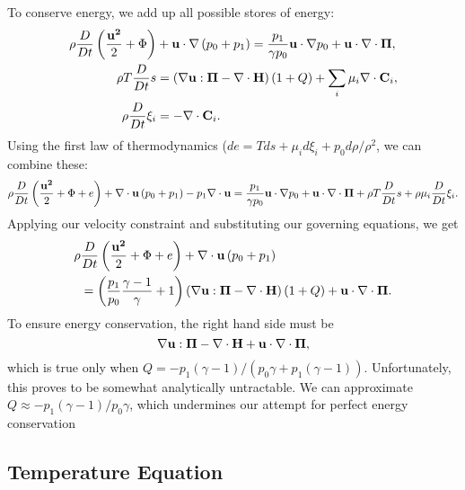 	To conserve energy, we add up all possible stores of energy:
	\begin{align}
		\rho\frac{D}{Dt}\left(\frac{\mathbf{u^{2}}}{2}+\Phi\right)&+\mathbf{u}\cdot\nabla \left(p_{0} + p_{1}\right)=\frac{p_{1}}{\gamma p_{0}}\mathbf{u}\cdot\nabla p_{0}+\mathbf{u}\cdot\nabla\cdot\mathbf{\Pi},\\
		\rho T\frac{D}{Dt}s&=\left(\nabla\mathbf{u}:\mathbf{\Pi}-\nabla\cdot{\mathbf{H}}\right)\left(1 + Q\right) +\sum_{i}\mu_{i}\nabla\cdot\mathbf{C}_{i},\\
		\rho\frac{D}{Dt}\xi_{i}&=-\nabla\cdot\mathbf{C}_{i}.
	\end{align}
	Using the first law of thermodynamics ($de = Tds + \mu_{i} d\xi_{i} + p_{0} d\rho / \rho^{2}$, we can combine these:
	\begin{equation}
		\rho\frac{D}{Dt}\left(\frac{\mathbf{u^{2}}}{2}+\Phi + e\right)+\nabla\cdot\mathbf{u} \left(p_{0} + p_{1}\right)-p_{1}\nabla\cdot\mathbf{u}=\frac{p_{1}}{\gamma p_{0}}\mathbf{u}\cdot\nabla p_{0}+\mathbf{u}\cdot\nabla\cdot\mathbf{\Pi}+\rho T\frac{D}{Dt}s+\rho \mu_{i}\frac{D}{Dt}\xi_{i}.
	\end{equation}
	Applying our velocity constraint and substituting our governing equations, we get
	\begin{align}
		\rho&\frac{D}{Dt}\left(\frac{\mathbf{u^{2}}}{2}+\Phi + e\right)+\nabla\cdot\mathbf{u} \left(p_{0} + p_{1}\right)\\
		&=\left(\frac{p_{1}}{p_{0}}\frac{\gamma - 1}{\gamma} + 1\right)\left(\nabla\mathbf{u}:\mathbf{\Pi}-\nabla\cdot{\mathbf{H}}\right)\left(1 + Q\right)+\mathbf{u}\cdot\nabla\cdot\mathbf{\Pi}.
	\end{align}
	To ensure energy conservation, the right hand side must be
	\begin{equation}
		\nabla\mathbf{u}:\mathbf{\Pi}-\nabla\cdot{\mathbf{H}} + \mathbf{u}\cdot\nabla\cdot\mathbf{\Pi},
	\end{equation}
	which is true only when $Q=-p_{1}\left(\gamma - 1\right)/\left(p_{0}\gamma + p_{1}\left(\gamma - 1\right)\right)$.
		Unfortunately, this proves to be somewhat analytically untractable.
		We can approximate $Q\approx-p_{1}\left(\gamma - 1\right)/p_{0}\gamma$, which undermines our attempt for perfect energy conservation


\subsection{Temperature Equation} %
\label{sub:temperature_equation}

